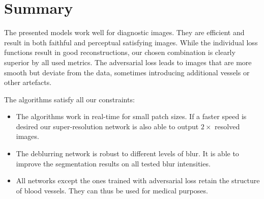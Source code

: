 \documentclass{scrartcl}
\begin{document}
\section{Summary}

The presented models work well for diagnostic images.
They are efficient and result in both faithful and perceptual satisfying images.
While the individual loss functions result in good reconstructions, our chosen combination is clearly superior by all used metrics.
The adversarial loss leads to images that are more smooth but deviate from the data, sometimes introducing additional vessels or other artefacts.

The algorithms satisfy all our constraints:
\begin{itemize}
\item The algorithms work in real-time for small patch sizes.
  If a faster speed is desired our super-resolution network is also able to output $2\times$ resolved images.
\item The deblurring network is robust to different levels of blur.
  It is able to improve the segmentation results on all tested blur intensities.
\item All networks except the ones trained with adversarial loss retain the structure of blood vessels.
  They can thus be used for medical purposes.
\end{itemize}

\printbibliography
\end{document}
